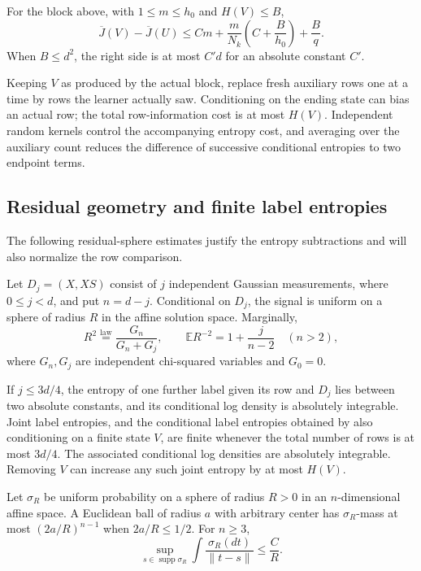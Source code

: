 \begin{proposition}
\label{rhyb:block}
For the block above, with \(1\le m\le h_0\) and \(H(V)\le B\),
\begin{equation}\label{rhyb:block-cost}
 \overline J(V)-\overline J(U)
 \le Cm+\frac{m}{N_k}\left(C+\frac{B}{h_0}\right)+\frac{B}{q}.
\end{equation}
When \(B\le d^2\), the right side is at most \(C'd\) for an absolute
constant \(C'\).
\end{proposition}

Keeping \(V\) as produced by the actual block, replace fresh auxiliary
rows one at a time by rows the learner actually saw.  Conditioning on the
ending state can bias an actual row; the total row-information cost is at
most \(H(V)\).
Independent random kernels control the accompanying entropy cost, and
averaging over the auxiliary count reduces the difference of successive
conditional entropies to two endpoint terms.

\subsection{Residual geometry and finite label entropies}

The following residual-sphere estimates justify the entropy subtractions
and will also normalize the row comparison.

\begin{lemma}\label{rhyb:residual}
Let \(D_j=(X,XS)\) consist of \(j\) independent Gaussian measurements,
where \(0\le j<d\), and put \(n=d-j\).  Conditional on \(D_j\), the signal
is uniform on a sphere of radius \(R\) in the affine solution space.
Marginally,
\begin{equation}\label{rhyb:radius}
 R^2\stackrel{\mathrm{law}}=
 \frac{G_n}{G_n+G_j},
 \qquad
 \mathbb E R^{-2}=1+\frac{j}{n-2}\quad(n>2),
\end{equation}
where \(G_n,G_j\) are independent chi-squared variables and \(G_0=0\).

If \(j\le 3d/4\), the entropy of one further label given its row and
\(D_j\) lies between two absolute constants, and its conditional log
density is absolutely integrable.  Joint label entropies, and the
conditional label entropies obtained by also conditioning on a finite
state \(V\), are finite whenever the total number of rows is at most
\(3d/4\).  The associated conditional log densities are absolutely
integrable.  Removing \(V\) can increase any such joint entropy by at
most \(H(V)\).

Let \(\sigma_R\) be uniform probability on a sphere of radius \(R>0\) in an
\(n\)-dimensional affine space.  A Euclidean ball of radius \(a\) with
arbitrary center has \(\sigma_R\)-mass at most
\((2a/R)^{n-1}\) when \(2a/R\le 1/2\).  For \(n\ge3\),
\begin{equation}\label{rhyb:reciprocal-sphere}
 \sup_{s\in\operatorname{supp}\sigma_R}
 \int\frac{\sigma_R(dt)}{\|t-s\|}
 \le \frac{C}{R}.
\end{equation}
\end{lemma}

